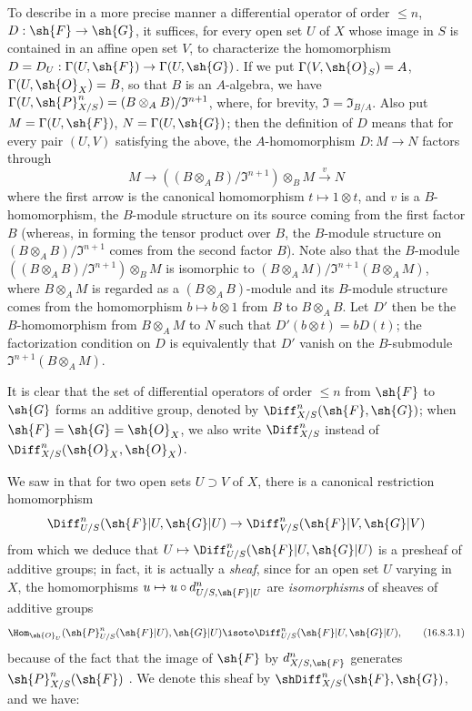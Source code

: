 \begin{env}[16.8.2]
\label{IV.16.8.2}
To describe in a more precise manner a differential operator of order $\leq n$, $D: \sh{F} \to \sh{G}$, it suffices, for every open set $U$ of $X$ whose image in $S$ is contained in an affine open set $V$, to characterize the homomorphism $D = D_U: \Gamma(U, \sh{F}) \to \Gamma(U, \sh{G})$.
If we put $\Gamma(V, \sh{O}_S) = A$, $\Gamma(U, \sh{O}_X) = B$, so that $B$ is an $A$-algebra, we have $\Gamma(U, \sh{P}_{X/S}^n) = (B \otimes_A B)/\mathfrak{I}^{n+1}$, where, for brevity, $\mathfrak{I} = \mathfrak{I}_{B/A}$. 
Also put $M = \Gamma(U, \sh{F})$, $N = \Gamma(U, \sh{G})$;
then the definition of $D$ means that for every pair $(U,V)$ satisfying the above, the $A$-homomorphism $D:M \to N$ factors through
\[
  M \to ((B \otimes_A B)/\mathfrak{I}^{n+1}) \otimes_B M \xrightarrow{v} N
\]
where the first arrow is the canonical homomorphism $t \mapsto 1 \otimes t$, and $v$ is a $B$-homomorphism, the $B$-module structure on its source coming from the first factor $B$ (whereas, in forming the tensor product over $B$, the $B$-module structure on $(B \otimes_A B)/\mathfrak{I}^{n+1}$ comes from the second factor $B$).
Note also that the $B$-module $((B \otimes_A B)/\mathfrak{I}^{n+1}) \otimes_B M$ is isomorphic to $(B \otimes_A M)/\mathfrak{I}^{n+1}(B \otimes_A M)$, where $B \otimes_A M$ is regarded as a $(B \otimes_A B)$-module and its $B$-module structure comes from the homomorphism $b \mapsto b \otimes 1$ from $B$ to $B \otimes_A B$.  
Let $D'$ then be the $B$-homomorphism from $B \otimes_A M$ to $N$ such that $D'(b \otimes t) = bD(t)$; the factorization condition on $D$ is equivalently that $D'$ vanish on the $B$-submodule $\mathfrak{I}^{n+1}(B \otimes_A M)$.
\end{env}

\begin{env}[16.8.3]
\label{IV.16.8.3}
It is clear that the set of differential operators of order $\leq n$ from $\sh{F}$ to $\sh{G}$ forms an additive group, denoted by $\Diff_{X/S}^n(\sh{F}, \sh{G})$;
when $\sh{F} = \sh{G} = \sh{O}_X$, we also write $\Diff_{X/S}^n$ instead of $\Diff_{X/S}^n(\sh{O}_X, \sh{O}_X)$.

We saw in  that for two open sets $U \supset V$ of $X$, there is a canonical restriction homomorphism
\[
  \Diff_{U/S}^n(\sh{F}|U, \sh{G}|U) \to \Diff_{V/S}^n(\sh{F}|V, \sh{G}|V)
\]
from which we deduce that $U \mapsto \Diff_{U/S}^n(\sh{F}|U, \sh{G}|U)$ is a presheaf of additive groups;
in fact, it is actually a \emph{sheaf}, since for an open set $U$ varying in $X$, the homomorphisms $u \mapsto u \circ d_{U/S, \sh{F}|U}^n$ are \emph{isomorphisms} of sheaves of additive groups
\[
  \label{IV.16.8.3.1}
  \Hom_{\sh{O}_U}(\sh{P}_{U/S}^n(\sh{F}|U), \sh{G}|U) \isoto \Diff_{U/S}^n(\sh{F}|U, \sh{G}|U),
  \tag{16.8.3.1}
\]
because of the fact that the image of $\sh{F}$ by $d_{X/S, \sh{F}}^n$ generates $\sh{P}_{X/S}^n(\sh{F})$ .
We denote this sheaf by $\shDiff_{X/S}^n(\sh{F}, \sh{G})$, and we have:
\end{env}

